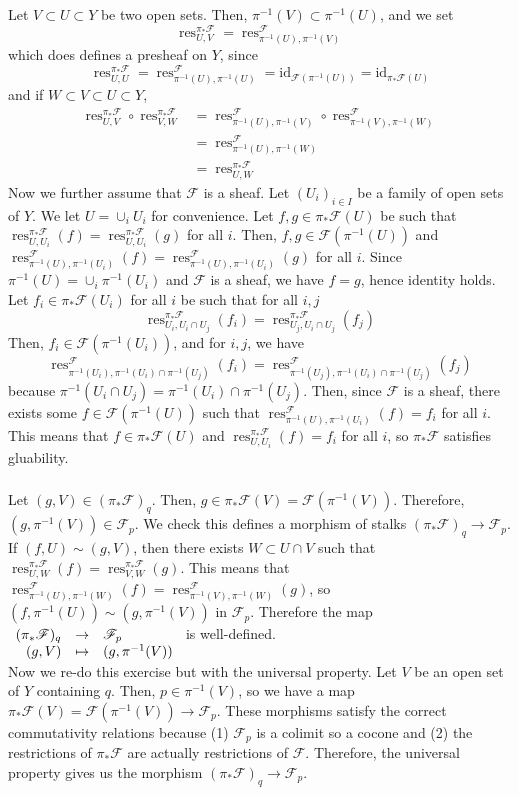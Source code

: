 \documentclass{article}
\newcommand{\id}{\mathrm{id}}
\DeclareMathOperator{\res}{res}
\newcommand{\applic}[4]{\begin{array}[t]{rcl}
#1 & \to & #2 \\
#3 & \mapsto & #4
\end{array}}
\newcommand{\Fsheaf}{\mathscr{F}}
\newcommand{\exercise}{\subsubsection} %
\begin{document}
\exercise{} Let $V \subset U \subset Y$ be two open sets. Then, $\pi^{-1}(V) \subset \pi^{-1}(U)$, and we set 
\[\res^{\pi_* \Fsheaf}_{U,V} = \res^\Fsheaf_{\pi^{-1}(U),\pi^{-1}(V)}\]
which does defines a presheaf on $Y$, since
\[\res^{\pi_* \Fsheaf}_{U,U} = \res^\Fsheaf_{\pi^{-1}(U),\pi^{-1}(U)} = \id_{\Fsheaf(\pi^{-1}(U))} = \id_{\pi_*\Fsheaf(U)}\]
and if $W \subset V \subset U \subset Y$,
\begin{align*}
    \res^{\pi_* \Fsheaf}_{U,V} \circ \res^{\pi_* \Fsheaf}_{V,W} & = 
    \res^\Fsheaf_{\pi^{-1}(U),\pi^{-1}(V)} \circ \res^\Fsheaf_{\pi^{-1}(V),\pi^{-1}(W)} \\
    & = \res^\Fsheaf_{\pi^{-1}(U),\pi^{-1}(W)} \\
    & = \res^{\pi_* \Fsheaf}_{U,W}
\end{align*}
Now we further assume that $\Fsheaf$ is a sheaf. Let $(U_i)_{i\in I}$ be a family of open sets of $Y$. We let $U = \cup_i U_i$ for convenience. Let $f,g \in \pi_*\Fsheaf(U)$ be such that $\res^{\pi_*\Fsheaf}_{U,U_i}(f) = \res^{\pi_*\Fsheaf}_{U,U_i}(g)$ for all $i$. Then, $f,g \in \Fsheaf(\pi^{-1}(U))$ and $\res^\Fsheaf_{\pi^{-1}(U),\pi^{-1}(U_i)}(f) = \res^\Fsheaf_{\pi^{-1}(U),\pi^{-1}(U_i)}(g)$ for all $i$. Since $\pi^{-1}(U) = \cup_i \pi^{-1}(U_i)$ and $\Fsheaf$ is a sheaf, we have $f = g$, hence identity holds. \\
Let $f_i \in \pi_*\Fsheaf(U_i)$ for all $i$ be such that for all $i,j$
\[\res_{U_i, U_i\cap U_j}^{\pi_*\Fsheaf} (f_i) = \res_{U_j, U_i\cap U_j}^{\pi_*\Fsheaf} (f_j)\]
Then, $f_i \in \Fsheaf(\pi^{-1}(U_i))$, and for $i,j$, we have
\[\res_{\pi^{-1}(U_i), \pi^{-1}(U_i) \cap \pi^{-1}(U_j)}^{\Fsheaf} (f_i) = \res_{\pi^{-1}(U_j), \pi^{-1}(U_i) \cap \pi^{-1}(U_j)}^{\Fsheaf} (f_j)\]
because $\pi^{-1}(U_i \cap U_j) = \pi^{-1}(U_i) \cap \pi^{-1}(U_j)$. Then, since $\Fsheaf$ is a sheaf, there exists some $f \in \Fsheaf(\pi^{-1}(U))$ such that $\res_{\pi^{-1}(U),\pi^{-1}(U_i)}^{\Fsheaf}(f) = f_i$ for all $i$. This means that $f \in \pi_*\Fsheaf(U)$ and $\res_{U, U_i}^{\pi_*\Fsheaf} (f) = f_i$ for all $i$, so $\pi_*\Fsheaf$ satisfies gluability.

\exercise{} Let $(g,V) \in (\pi_*\Fsheaf)_q$. Then, $g \in \pi_*\Fsheaf(V) = \Fsheaf(\pi^{-1}(V))$. Therefore, $(g,\pi^{-1}(V)) \in \Fsheaf_p$. We check this defines a morphism of stalks $(\pi_*\Fsheaf)_q \to \Fsheaf_p$. If $(f,U) \sim (g,V)$, then there exists $W \subset U \cap V$ such that $\res_{U,W}^{\pi_*\Fsheaf} (f) = \res_{V,W}^{\pi_*\Fsheaf} (g)$. This means that $\res_{\pi^{-1}(U),\pi^{-1}(W)}^\Fsheaf (f) = \res_{\pi^{-1}(V),\pi^{-1}(W)}^\Fsheaf(g)$, so $(f,\pi^{-1}(U)) \sim (g,\pi^{-1}(V))$ in $\Fsheaf_p$. Therefore the map $\applic{(\pi_*\Fsheaf)_q}{\Fsheaf_p}{(g,V)}{(g,\pi^{-1}(V))}$ is well-defined. \\
Now we re-do this exercise but with the universal property. Let $V$ be an open set of $Y$ containing $q$. Then, $p \in \pi^{-1}(V)$, so we have a map $\pi_*\Fsheaf(V) = \Fsheaf(\pi^{-1}(V)) \to \Fsheaf_p$. These morphisms satisfy the correct commutativity relations because (1) $\Fsheaf_p$ is a colimit so a cocone and (2) the restrictions of $\pi_*\Fsheaf$ are actually restrictions of $\Fsheaf$. Therefore, the universal property gives us the morphism $(\pi_*\Fsheaf)_q \to \Fsheaf_p$.
\end{document}
